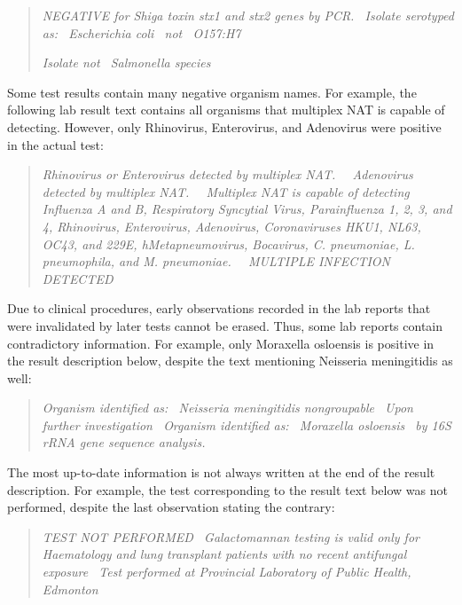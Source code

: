 \documentclass[12pt]{article}
\begin{document}
\begin{quote}
    \textit{NEGATIVE for Shiga toxin stx1 and stx2 genes by PCR. \textbar\ Isolate serotyped as: \textbar\ Escherichia coli \textbar\ not \textbar\ O157:H7}
    
    \textit{Isolate not \textbar\ Salmonella species}
\end{quote}

Some test results contain many negative organism names. For example, the following lab result text contains all organisms that multiplex NAT is capable of detecting. However, only Rhinovirus, Enterovirus, and Adenovirus were positive in the actual test:

\begin{quote}
    \textit{Rhinovirus or Enterovirus detected by multiplex NAT. \textbar\ \textbar\ Adenovirus detected by multiplex NAT. \textbar\ \textbar\ Multiplex NAT is capable of detecting Influenza A and B, Respiratory Syncytial Virus, Parainfluenza 1, 2, 3, and 4, Rhinovirus, Enterovirus, Adenovirus, Coronaviruses HKU1, NL63, OC43, and 229E, hMetapneumovirus, Bocavirus, C. pneumoniae, L. pneumophila, and M. pneumoniae. \textbar\ \textbar\ MULTIPLE INFECTION DETECTED}
\end{quote}

Due to clinical procedures, early observations recorded in the lab reports that were invalidated by later tests cannot be erased. Thus, some lab reports contain contradictory information. For example, only Moraxella osloensis is positive in the result description below, despite the text mentioning Neisseria meningitidis as well:

\begin{quote}
    \textit{Organism identified as: \textbar\ Neisseria meningitidis nongroupable \textbar\ Upon further investigation \textbar\ Organism identified as: \textbar\ Moraxella osloensis \textbar\ by 16S rRNA gene sequence analysis.}
\end{quote}

The most up-to-date information is not always written at the end of the result description. For example, the test corresponding to the result text below was not performed, despite the last observation stating the contrary:

\begin{quote}
    \textit{TEST NOT PERFORMED \textbar\ Galactomannan testing is valid only for Haematology and lung transplant patients with no recent antifungal exposure \textbar\ Test performed at Provincial Laboratory of Public Health, Edmonton}
\end{quote}
\end{document}
